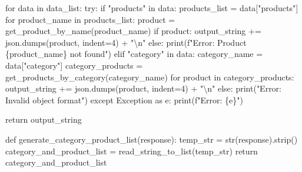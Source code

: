 \documentclass[
  letterpaper,
  DIV=11,
  numbers=noendperiod]{scrreprt}
\newenvironment{Shaded}{\begin{snugshade}}{\end{snugshade}}
\newcommand{\BuiltInTok}[1]{\textcolor[rgb]{0.00,0.23,0.31}{#1}}
\newcommand{\CharTok}[1]{\textcolor[rgb]{0.13,0.47,0.30}{#1}}
\newcommand{\ControlFlowTok}[1]{\textcolor[rgb]{0.00,0.23,0.31}{#1}}
\newcommand{\DecValTok}[1]{\textcolor[rgb]{0.68,0.00,0.00}{#1}}
\newcommand{\ImportTok}[1]{\textcolor[rgb]{0.00,0.46,0.62}{#1}}
\newcommand{\KeywordTok}[1]{\textcolor[rgb]{0.00,0.23,0.31}{#1}}
\newcommand{\NormalTok}[1]{\textcolor[rgb]{0.00,0.23,0.31}{#1}}
\newcommand{\OperatorTok}[1]{\textcolor[rgb]{0.37,0.37,0.37}{#1}}
\newcommand{\PreprocessorTok}[1]{\textcolor[rgb]{0.68,0.00,0.00}{#1}}
\newcommand{\SpecialCharTok}[1]{\textcolor[rgb]{0.37,0.37,0.37}{#1}}
\newcommand{\SpecialStringTok}[1]{\textcolor[rgb]{0.13,0.47,0.30}{#1}}
\newcommand{\StringTok}[1]{\textcolor[rgb]{0.13,0.47,0.30}{#1}}
\begin{document}
\begin{Shaded}
\begin{Highlighting}[]
    \ControlFlowTok{for}\NormalTok{ data }\KeywordTok{in}\NormalTok{ data\_list:}
        \ControlFlowTok{try}\NormalTok{:}
            \ControlFlowTok{if} \StringTok{"products"} \KeywordTok{in}\NormalTok{ data:}
\NormalTok{                products\_list }\OperatorTok{=}\NormalTok{ data[}\StringTok{"products"}\NormalTok{]}
                \ControlFlowTok{for}\NormalTok{ product\_name }\KeywordTok{in}\NormalTok{ products\_list:}
\NormalTok{                    product }\OperatorTok{=}\NormalTok{ get\_product\_by\_name(product\_name)}
                    \ControlFlowTok{if}\NormalTok{ product:}
\NormalTok{                        output\_string }\OperatorTok{+=}\NormalTok{ json.dumps(product, indent}\OperatorTok{=}\DecValTok{4}\NormalTok{) }\OperatorTok{+} \StringTok{"}\CharTok{\textbackslash{}n}\StringTok{"}
                    \ControlFlowTok{else}\NormalTok{:}
                        \BuiltInTok{print}\NormalTok{(}\SpecialStringTok{f"Error: Product \textquotesingle{}}\SpecialCharTok{\{}\NormalTok{product\_name}\SpecialCharTok{\}}\SpecialStringTok{\textquotesingle{} not found"}\NormalTok{)}
            \ControlFlowTok{elif} \StringTok{"category"} \KeywordTok{in}\NormalTok{ data:}
\NormalTok{                category\_name }\OperatorTok{=}\NormalTok{ data[}\StringTok{"category"}\NormalTok{]}
\NormalTok{                category\_products }\OperatorTok{=}\NormalTok{ get\_products\_by\_category(category\_name)}
                \ControlFlowTok{for}\NormalTok{ product }\KeywordTok{in}\NormalTok{ category\_products:}
\NormalTok{                    output\_string }\OperatorTok{+=}\NormalTok{ json.dumps(product, indent}\OperatorTok{=}\DecValTok{4}\NormalTok{) }\OperatorTok{+} \StringTok{"}\CharTok{\textbackslash{}n}\StringTok{"}
            \ControlFlowTok{else}\NormalTok{:}
                \BuiltInTok{print}\NormalTok{(}\StringTok{"Error: Invalid object format"}\NormalTok{)}
        \ControlFlowTok{except} \PreprocessorTok{Exception} \ImportTok{as}\NormalTok{ e:}
            \BuiltInTok{print}\NormalTok{(}\SpecialStringTok{f"Error: }\SpecialCharTok{\{}\NormalTok{e}\SpecialCharTok{\}}\SpecialStringTok{"}\NormalTok{)}

    \ControlFlowTok{return}\NormalTok{ output\_string}

\KeywordTok{def}\NormalTok{ generate\_category\_product\_list(response):}
\NormalTok{    temp\_str }\OperatorTok{=} \BuiltInTok{str}\NormalTok{(response).strip()}
\NormalTok{    category\_and\_product\_list }\OperatorTok{=}\NormalTok{ read\_string\_to\_list(temp\_str)}
    \ControlFlowTok{return}\NormalTok{ category\_and\_product\_list}
\end{Highlighting}
\end{Shaded}
\end{document}
